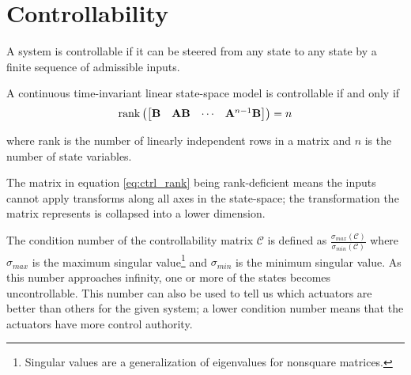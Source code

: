 \section{Controllability}

A \gls{system} is controllable if it can be steered from any \gls{state} to any
\gls{state} by a finite sequence of admissible \glspl{input}.
\begin{theorem}[Controllability]
  A continuous \gls{time-invariant} linear state-space \gls{model} is
  controllable if and only if
  \begin{equation}
    \operatorname{rank}\left(
    \begin{bmatrix}
      \mathbf{B} & \mathbf{A}\mathbf{B} & \cdots & \mathbf{A}^{n-1}\mathbf{B}
    \end{bmatrix}
    \right) = n
    \label{eq:ctrl_rank}
  \end{equation}

  where rank is the number of linearly independent rows in a matrix and $n$ is
  the number of \gls{state} variables.
\end{theorem}

The matrix in equation \eqref{eq:ctrl_rank} being rank-deficient means the
\glspl{input} cannot apply transforms along all axes in the state-space; the
transformation the matrix represents is collapsed into a lower dimension.

The condition number of the controllability matrix $\mathcal{C}$ is defined as
$\frac{\sigma_{max}(\mathcal{C})}{\sigma_{min}(\mathcal{C})}$ where
$\sigma_{max}$ is the maximum singular
value\footnote{\label{footn:singular_val}Singular values are a generalization of
eigenvalues for nonsquare matrices.} and $\sigma_{min}$ is the minimum singular
value. As this number approaches infinity, one or more of the \glspl{state}
becomes uncontrollable. This number can also be used to tell us which actuators
are better than others for the given \gls{system}; a lower condition number
means that the actuators have more control authority.
